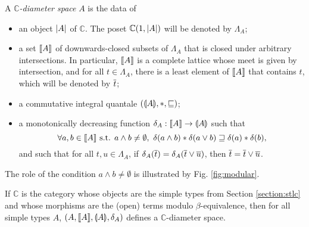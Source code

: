 \begin{definition} A \emph{$\mathbb{C}$-diameter space} $A$ is the data of \begin{itemize}
\item an object $\left\vert A\right\vert$ of $\mathbb{C}$. The poset $\mathbb{C}(1,\left\vert A\right\vert)$ will be denoted by $\Lambda_A$;
\item a set $\llbracket A \rrbracket$ of downwards-closed subsets of $\Lambda_A$ that is closed under arbitrary intersections. In particular, $\llbracket A \rrbracket$ is a complete lattice whose meet is given by intersection, and for all $t\in\Lambda_A$, there is a least element of $\llbracket A \rrbracket$ that contains $t$, which will be denoted by $\overline{t}$;
\item a commutative integral quantale $(\llparenthesis A \rrparenthesis, \mathbin{\ast}, \sqsubseteq)$;
\item a monotonically decreasing function $\delta_A : \llbracket A \rrbracket \to \llparenthesis A \rrparenthesis$ such that $$\forall a,b \in \llbracket A \rrbracket \text{ s.t. } a \wedge b \neq \emptyset,~ \delta(a \wedge b) \mathbin{\ast} \delta(a \vee b) \sqsupseteq \delta(a) \mathbin{\ast} \delta(b)\text{,}$$
and such that for all $t,u \in \Lambda_A$, if $\delta_A(\overline{t}) = \delta_A(\overline{t} \vee \overline{u})$, then $\overline{t} = \overline{t} \vee \overline{u}$.
\end{itemize}
\end{definition}

The role of the condition $a \wedge b \neq \emptyset$ is illustrated by Fig. \ref{fig:modular}.

\begin{example} If $\mathbb{C}$ is the category whose objects are the simple types from Section \ref{section:stlc} and whose morphisms are the (open) terms modulo $\beta$-equivalence, then for all simple types $A$, $(A, \llbracket A \rrbracket, \llparenthesis A \rrparenthesis, \delta_A)$ defines a $\mathbb{C}$-diameter space.
\end{example}

